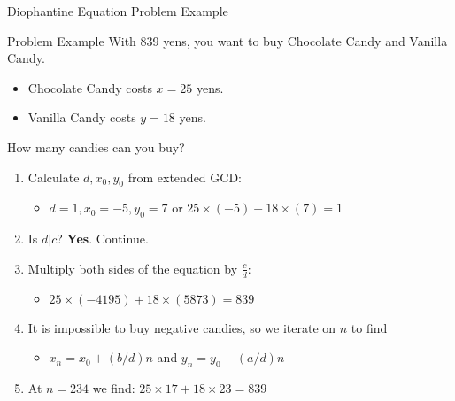 \begin{frame}{Diophantine Equation Problem Example}
    \begin{block}{Problem Example}
      With 839 yens, you want to buy Chocolate Candy and Vanilla Candy.
      \begin{itemize}
        \item Chocolate Candy costs $x=25$ yens.
        \item Vanilla Candy costs $y=18$ yens.
      \end{itemize}
      How many candies can you buy?
    \end{block}

    \begin{enumerate}
      \item Calculate $d, x_0, y_0$ from extended GCD:
      \begin{itemize}
        \item $d = 1, x_0 = -5, y_0 = 7$ or $25\times(-5) + 18\times(7) = 1$
      \end{itemize}
      \item Is $d|c$? {\bf Yes}. Continue.
      \item Multiply both sides of the equation by $\frac{c}{d}$:
      \begin{itemize}
        \item $25 \times (-4195) + 18\times(5873) = 839$
      \end{itemize}
      \item It is impossible to buy negative candies, so we iterate on $n$ to find
      \begin{itemize}
        \item $x_n = x_0 + (b/d)n$ and $y_n = y_0 - (a/d)n$
      \end{itemize}
      \item At $n = 234$ we find: $25 \times 17 + 18 \times 23 = 839$
    \end{enumerate}
\end{frame}


